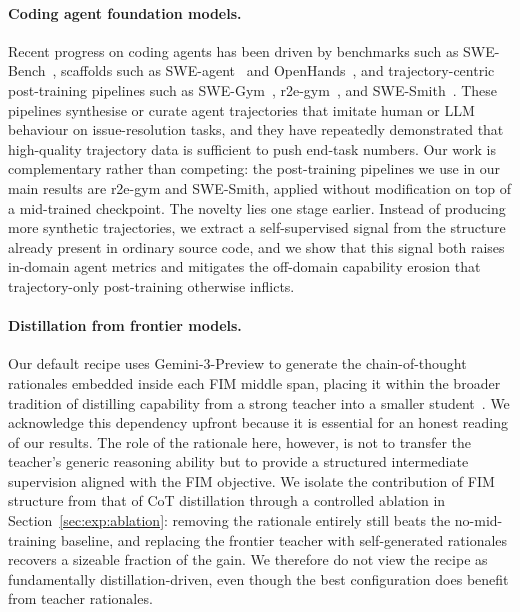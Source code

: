 \paragraph{Coding agent foundation models.}
Recent progress on coding agents has been driven by benchmarks such as
SWE-Bench~\citep{swebench}, scaffolds such as
SWE-agent~\citep{sweagent} and OpenHands~\citep{openhands}, and
trajectory-centric post-training pipelines such as
SWE-Gym~\citep{swegym}, r2e-gym~\citep{r2egym}, and
SWE-Smith~\citep{swesmith}. These pipelines synthesise or curate agent
trajectories that imitate human or LLM behaviour on issue-resolution
tasks, and they have repeatedly demonstrated that high-quality trajectory
data is sufficient to push end-task numbers. Our work is complementary
rather than competing: the post-training pipelines we use in our main
results are r2e-gym and SWE-Smith, applied without modification on top of
a mid-trained checkpoint. The novelty lies one stage earlier. Instead of
producing more synthetic trajectories, we extract a self-supervised
signal from the structure already present in ordinary source code, and
we show that this signal both raises in-domain agent metrics and
mitigates the off-domain capability erosion that trajectory-only
post-training otherwise inflicts.

\paragraph{Distillation from frontier models.}
Our default recipe uses Gemini-3-Preview to generate the chain-of-thought
rationales embedded inside each FIM middle span, placing it within the
broader tradition of distilling capability from a strong teacher into a
smaller student~\citep{orca, selfinstruct, distillwhisper}. We
acknowledge this dependency upfront because it is essential for an honest
reading of our results. The role of the rationale here, however, is not
to transfer the teacher's generic reasoning ability but to provide a
structured intermediate supervision aligned with the FIM objective.
We isolate the contribution of FIM structure from that of CoT
distillation through a controlled ablation in
Section~\ref{sec:exp:ablation}: removing the rationale entirely still
beats the no-mid-training baseline, and replacing the frontier teacher
with self-generated rationales recovers a sizeable fraction of the gain.
We therefore do not view the recipe as fundamentally distillation-driven,
even though the best configuration does benefit from teacher rationales.

